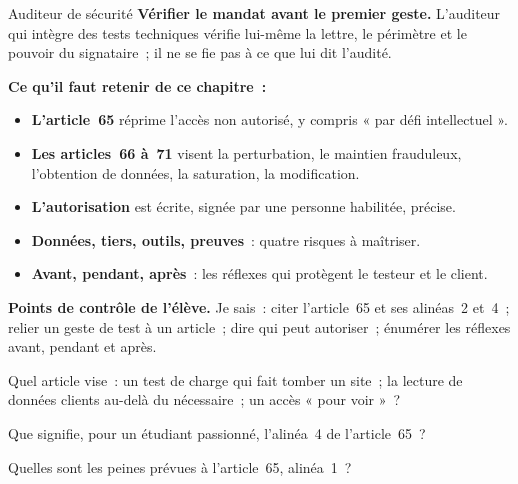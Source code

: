 \begin{boxmetier}{Auditeur de sécurité}
\textbf{Vérifier le mandat avant le premier geste.} L'auditeur qui intègre
des tests techniques vérifie lui-même la lettre, le périmètre et le
pouvoir du signataire~; il ne se fie pas à ce que lui dit l'audité.
\end{boxmetier}

\separateur

\begin{boxresume}
\textbf{Ce qu'il faut retenir de ce chapitre~:}
\begin{itemize}
    \item \textbf{L'article~65} réprime l'accès non autorisé, y compris
          « par défi intellectuel ».
    \item \textbf{Les articles~66 à~71} visent la perturbation, le maintien
          frauduleux, l'obtention de données, la saturation, la modification.
    \item \textbf{L'autorisation} est écrite, signée par une personne
          habilitée, précise.
    \item \textbf{Données, tiers, outils, preuves}~: quatre risques à
          maîtriser.
    \item \textbf{Avant, pendant, après}~: les réflexes qui protègent le
          testeur et le client.
\end{itemize}
\end{boxresume}

\begin{boxinfo}
\textbf{Points de contrôle de l'élève.} Je sais~: citer l'article~65 et ses
alinéas~2 et~4~; relier un geste de test à un article~; dire qui peut
autoriser~; énumérer les réflexes avant, pendant et après.
\end{boxinfo}

\bigskip

\begin{boxexo}[title={\ding{45}\quad Exercice~2.1. Quel article~? \niveaubase}]
Quel article vise~: un test de charge qui fait tomber un site~; la lecture
de données clients au-delà du nécessaire~; un accès « pour voir »~?
\end{boxexo}

\begin{boxexo}[title={\ding{45}\quad Exercice~2.2. Défi intellectuel \niveaubase}]
Que signifie, pour un étudiant passionné, l'alinéa~4 de l'article~65~?
\end{boxexo}

\begin{boxexo}[title={\ding{45}\quad Exercice~2.3. Les peines \niveaubase}]
Quelles sont les peines prévues à l'article~65, alinéa~1~?
\end{boxexo}

